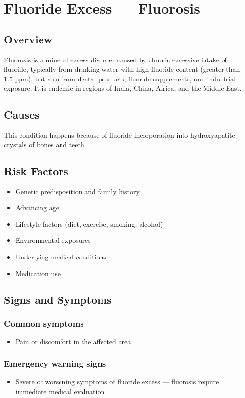 \chapter{Fluoride Excess --- Fluorosis}
\label{sec:Fluorosis}

\section{Overview}
Fluorosis is a mineral excess disorder caused by chronic excessive intake of fluoride, typically from drinking water with high fluoride content (greater than 1.5 ppm), but also from dental products, fluoride supplements, and industrial exposure. It is endemic in regions of India, China, Africa, and the Middle East.
\section{Causes}
This condition happens because of fluoride incorporation into hydroxyapatite crystals of bones and teeth.     
\section{Risk Factors}

\begin{itemize}[noitemsep]
  \item Genetic predisposition and family history
  \item Advancing age
  \item Lifestyle factors (diet, exercise, smoking, alcohol)
  \item Environmental exposures
  \item Underlying medical conditions
  \item Medication use
\end{itemize}
\section{Signs and Symptoms}

\subsection{Common symptoms}
\begin{itemize}[noitemsep]
  \item Pain or discomfort in the affected area
  \end{itemize}

\subsection{Emergency warning signs}
\begin{itemize}[noitemsep]
  \item Severe or worsening symptoms of fluoride excess --- fluorosis require immediate medical evaluation
\end{itemize}
